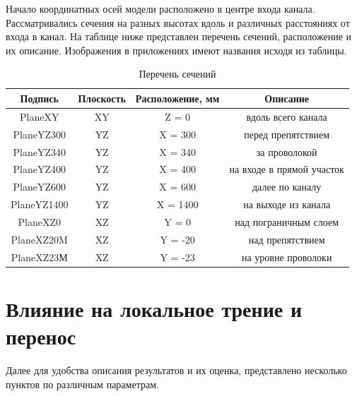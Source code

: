 	Начало координатных осей модели расположено в центре входа канала. Рассматривались сечения на разных высотах вдоль и различных расстояниях от входа в канал. На таблице ниже представлен перечень сечений, расположение и их описание. Изображения в приложениях имеют названия исходя из таблицы.
	\begin{table}[H]
		\begin{center}
			\begin{tabular}{|c|c|c|c|}
				\hline
				Подпись & Плоскость & Расположение, мм & Описание\\
				\hline
				PlaneXY & XY & Z = 0 & вдоль всего канала\\
				\hline
				PlaneYZ300 & YZ & X = 300 & перед препятствием\\
				\hline
				PlaneYZ340 & YZ & X = 340 & за проволокой\\
				\hline
				PlaneYZ400 & YZ & X = 400 & на входе в прямой участок\\
				\hline
				PlaneYZ600 & YZ & X = 600 & далее по каналу\\
				\hline
				PlaneYZ1400 & YZ & X = 1400 & на выходе из канала\\
				\hline
				PlaneXZ0 & XZ & Y = 0 & над пограничным слоем\\
				\hline
				PlaneXZ20M & XZ & Y = -20 & над препятствием\\
				\hline
				PlaneXZ23М & XZ & Y = -23 & на уровне проволоки\\
				\hline
			\end{tabular}
		\end{center}
		\label{tbl:sections}
		\caption{Перечень сечений}
	\end{table}
	
\section{Влияние на локальное трение и перенос}
	Далее для удобства описания результатов и их оценка, представлено несколько пунктов по различным параметрам.
